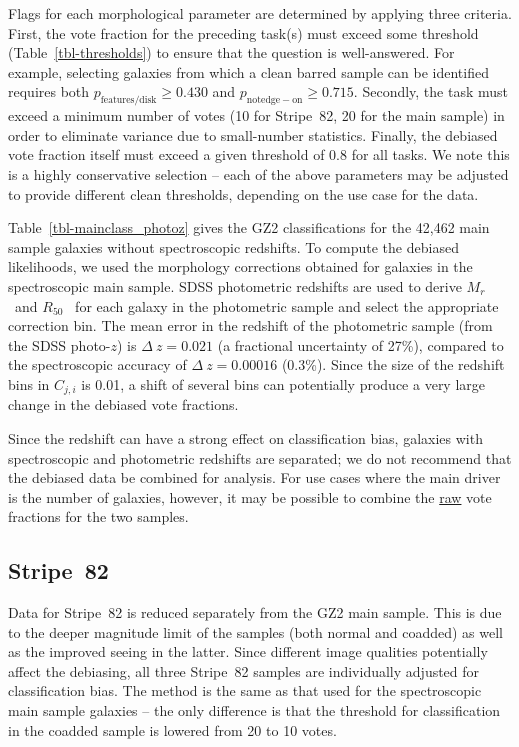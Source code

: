 \documentclass[useAMS,usenatbib]{mn2e}
\newcommand{\mr}{$M_r$}
\newcommand{\rfifty}{$R_{50}$}
\begin{document}
Flags for each morphological parameter are determined by applying three criteria. First, the vote fraction for the preceding task(s) must exceed some threshold (Table~\ref{tbl-thresholds}) to ensure that the question is well-answered. For example, selecting galaxies from which a clean barred sample can be identified requires both $p_\mathrm{features/disk}\geq0.430$ and $p_\mathrm{not edge-on}\geq0.715$. Secondly, the task must exceed a minimum number of votes (10 for Stripe~82, 20 for the main sample) in order to eliminate variance due to small-number statistics. Finally, the debiased vote fraction itself must exceed a given threshold of 0.8 for all tasks. We note this is a highly conservative selection -- each of the above parameters may be adjusted to provide different clean thresholds, depending on the use case for the data.%

Table~\ref{tbl-mainclass_photoz} gives the GZ2 classifications for the 42,462 main sample galaxies without spectroscopic redshifts. To compute the debiased likelihoods, we used the morphology corrections obtained for galaxies in the spectroscopic main sample. SDSS photometric redshifts \citep{csa03} are used to derive \mr~and \rfifty~ for each galaxy in the photometric sample and select the appropriate correction bin. The mean error in the redshift of the photometric sample (from the SDSS photo-$z$) is $\Delta~z=0.021$ (a fractional uncertainty of 27\%), compared to the spectroscopic accuracy of $\Delta~z=0.00016$ (0.3\%). Since the size of the redshift bins in $C_{j,i}$ is 0.01, a shift of several bins can potentially produce a very large change in the debiased vote fractions. 

Since the redshift can have a strong effect on classification bias, galaxies with spectroscopic and photometric redshifts are separated; we do not recommend that the debiased data be combined for analysis. For use cases where the main driver is the number of galaxies, however, it may be possible to combine the \underline{raw} vote fractions for the two samples.

\subsection{Stripe~82}\label{ssec-s82}

Data for Stripe~82 is reduced separately from the GZ2 main sample. This is due to the deeper magnitude limit of the samples (both normal and coadded) as well as the improved seeing in the latter. Since different image qualities potentially affect the debiasing, all three Stripe~82 samples are individually adjusted for classification bias. The method is the same as that used for the spectroscopic main sample galaxies -- the only difference is that the threshold for classification in the coadded sample is lowered from 20 to 10 votes. 
\end{document}
